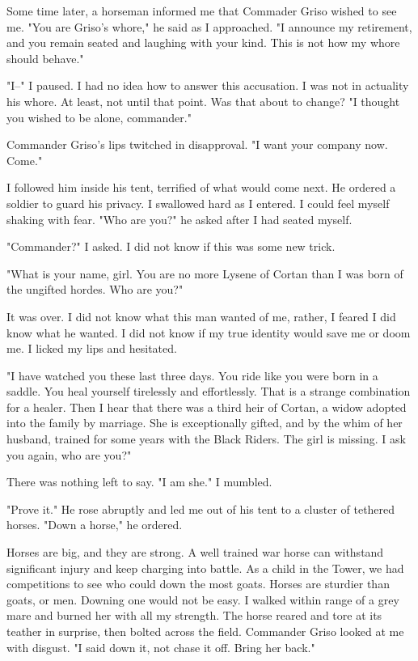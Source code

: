 \documentclass{article}
\begin{document}
Some time later, a horseman informed me that Commader Griso wished to see me. "You are Griso's whore," he said as I approached. "I announce my retirement, and you remain seated and laughing with your kind. This is not how my whore should behave."

"I--" I paused. I had no idea how to answer this accusation. I was not in actuality his whore. At least, not until that point. Was that about to change? "I thought you wished to be alone, commander."

Commander Griso's lips twitched in disapproval. "I want your company now. Come."

I followed him inside his tent, terrified of what would come next. He ordered a soldier to guard his privacy. I swallowed hard as I entered. I could feel myself shaking with fear. "Who are you?" he asked after I had seated myself.

"Commander?" I asked. I did not know if this was some new trick.

"What is your name, girl. You are no more Lysene of Cortan than I was born of the ungifted hordes. Who are you?"

It was over. I did not know what this man wanted of me, rather, I feared I did know what he wanted. I did not know if my true identity would save me or doom me. I licked my lips and hesitated. 

"I have watched you these last three days. You ride like you were born in a saddle. You heal yourself tirelessly and effortlessly. That is a strange combination for a healer. Then I hear that there was a third heir of Cortan, a widow adopted into the family by marriage. She is exceptionally gifted, and by the whim of her husband, trained for some years with the Black Riders. The girl is missing. I ask you again, who are you?"

There was nothing left to say. "I am she." I mumbled.

"Prove it." He rose abruptly and led me out of his tent to a cluster of tethered horses. "Down a horse," he ordered.

Horses are big, and they are strong. A well trained war horse can withstand significant injury and keep charging into battle. As a child in the Tower, we had competitions to see who could down the most goats. Horses are sturdier than goats, or men. Downing one would not be easy. I walked within range of a grey mare and burned her with all my strength. The horse reared and tore at its teather in surprise, then bolted across the field. Commander Griso looked at me with disgust. "I said down it, not chase it off. Bring her back."
\end{document}
